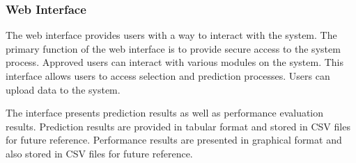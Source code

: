 \subsubsection*{Web Interface}\label{subsubsec:web_interface}
The web interface provides users with a way to interact with the system. The primary function of the web interface is to provide secure access to the system process. Approved users can interact with various modules on the system. This interface allows users to access selection and prediction processes. Users can upload data to the system.

The interface presents prediction results as well as performance evaluation results. Prediction results are provided in tabular format and stored in CSV files for future reference. Performance results are presented in graphical format and also stored in CSV files for future reference.
